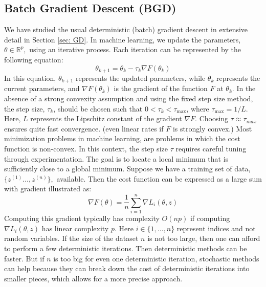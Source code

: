 \subsection{Batch Gradient Descent (BGD)}
We have studied the usual deterministic (batch) gradient descent in extensive detail in Section \ref{sec: GD}. In machine learning, we update the parameters, $\theta\in\mathbb{R}^{p},$ using an iterative process. Each iteration can be represented by the following equation:
\begin{equation*}\tag{5.3.1}
\theta_{k+1} = \theta_{k} - \tau_{k}\nabla F(\theta_{k})
\end{equation*}
In this equation, $\theta_{k+1}$ represents the updated parameters, while $\theta_{k}$ represents the current parameters, and $\nabla F(\theta_{k})$ is the gradient of the function $F$ at $\theta_{k}$. In the absence of a strong convexity assumption and using the fixed step size method, the step size, $\tau_{k}$, should be chosen such that $0 < \tau_{k} < \tau_{\text{max}}$, where $\tau_{\text{max}} = 1/L$. Here, $L$ represents the Lipschitz constant of the gradient $\nabla F$. Choosing $\tau \approx \tau_{max}$ ensures quite fast convergence. (even linear rates if $F$ is strongly convex.) Most minimization problems in machine learning, are problems in which the cost function is non-convex. In this context, the step size $\tau$ requires careful tuning through experimentation. The goal is to locate a local minimum that is sufficiently close to a global minimum. Suppose we have a training set of data, $\{z^{(1)}\ldots,z^{(n)}\},$ available. Then the cost function can be expressed as a large sum with gradient illustrated as: 
\begin{equation*}\label{full_grad_of_sum}\tag{5.3.2}
\nabla F(\theta) = \frac{1}{n} \sum_{i=1}^{n}\nabla L_{i}(\theta, z)
\end{equation*}
Computing this gradient typically has complexity $O(np)$ if computing $\nabla L_{i}(\theta, z)$ has linear complexity $p.$ Here $i \in \{1,\ldots,n\}$ represent indices and not random variables. If the size of the dataset $n$ is not too large, then one can afford to perform a few deterministic iterations. Then deterministic methods can be faster. But if $n$ is too big for even one deterministic iteration, stochastic methods can help because they can break down the cost of deterministic iterations into smaller pieces, which allows for a more precise approach.
\newpage
